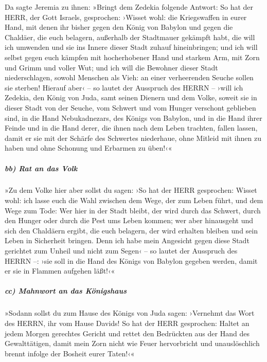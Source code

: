 Da sagte Jeremia zu ihnen: »Bringt dem Zedekia folgende
Antwort: So hat der HERR, der Gott Israels, gesprochen:
›Wisset wohl: die Kriegswaffen in eurer Hand, mit denen ihr bisher gegen
den König von Babylon und gegen die Chaldäer, die euch belagern,
außerhalb der Stadtmauer gekämpft habt, die will ich umwenden und sie
ins Innere dieser Stadt zuhauf hineinbringen; und ich will
selbst gegen euch kämpfen mit hocherhobener Hand und starkem Arm, mit
Zorn und Grimm und voller Wut; und ich will die Bewohner
dieser Stadt niederschlagen, sowohl Menschen als Vieh: an einer
verheerenden Seuche sollen sie sterben! Hierauf aber‹ --
so lautet der Ausspruch des HERRN -- ›will ich Zedekia, den König von
Juda, samt seinen Dienern und dem Volke, soweit sie in dieser Stadt von
der Seuche, vom Schwert und vom Hunger verschont geblieben sind, in die
Hand Nebukadnezars, des Königs von Babylon, und in die Hand ihrer Feinde
und in die Hand derer, die ihnen nach dem Leben trachten, fallen lassen,
damit er sie mit der Schärfe des Schwertes niederhaue, ohne Mitleid mit
ihnen zu haben und ohne Schonung und Erbarmen zu üben!‹«

\hypertarget{bb-rat-an-das-volk}{%
\subparagraph{bb) Rat an das Volk}\label{bb-rat-an-das-volk}}

»Zu dem Volke hier aber sollst du sagen: ›So hat der HERR
gesprochen: Wisset wohl: ich lasse euch die Wahl zwischen dem Wege, der
zum Leben führt, und dem Wege zum Tode: Wer hier in der
Stadt bleibt, der wird durch das Schwert, durch den Hunger oder durch
die Pest ums Leben kommen; wer aber hinausgeht und sich den Chaldäern
ergibt, die euch belagern, der wird erhalten bleiben und sein Leben in
Sicherheit bringen. Denn ich habe mein Angesicht gegen
diese Stadt gerichtet zum Unheil und nicht zum Segen‹ -- so lautet der
Ausspruch des HERRN --: ›sie soll in die Hand des Königs von Babylon
gegeben werden, damit er sie in Flammen aufgehen läßt!‹«

\hypertarget{cc-mahnwort-an-das-kuxf6nigshaus}{%
\subparagraph{cc) Mahnwort an das
Königshaus}\label{cc-mahnwort-an-das-kuxf6nigshaus}}

»Sodann sollst du zum Hause des Königs von Juda sagen:
›Vernehmt das Wort des HERRN, ihr vom Hause Davids! So
hat der HERR gesprochen: Haltet an jedem Morgen gerechtes Gericht und
rettet den Bedrückten aus der Hand des Gewalttätigen, damit mein Zorn
nicht wie Feuer hervorbricht und unauslöschlich brennt infolge der
Bosheit eurer Taten!‹«


